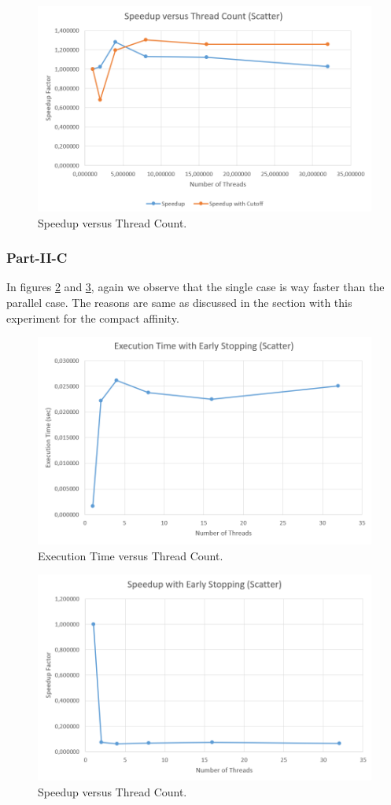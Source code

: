 \documentclass[11pt,reqno]{amsart}
\begin{document}
\begin{figure}[h]
\centering
\includegraphics[width=0.75\linewidth]{speedup_A_B_scatter.png}
\caption{Speedup versus Thread Count.}
\label{fig:spd_A_B_s}
\end{figure}

\newpage

\subsubsection{Part-II-C}
In figures \ref{fig:early_s} and \ref{fig:speed_early_s}, again we observe that the single case is way faster than the parallel case. The reasons are same as discussed in the section with this experiment for the compact affinity.
\begin{figure}[h]
\centering
\includegraphics[width=0.75\linewidth]{early_stop_scatter.png}
\caption{Execution Time versus Thread Count.}
\label{fig:early_s}
\end{figure}

\begin{figure}[h]
\centering
\includegraphics[width=0.75\linewidth]{speed_early_stop_scatter.png}
\caption{Speedup versus Thread Count.}
\label{fig:speed_early_s}
\end{figure}
\end{document}
